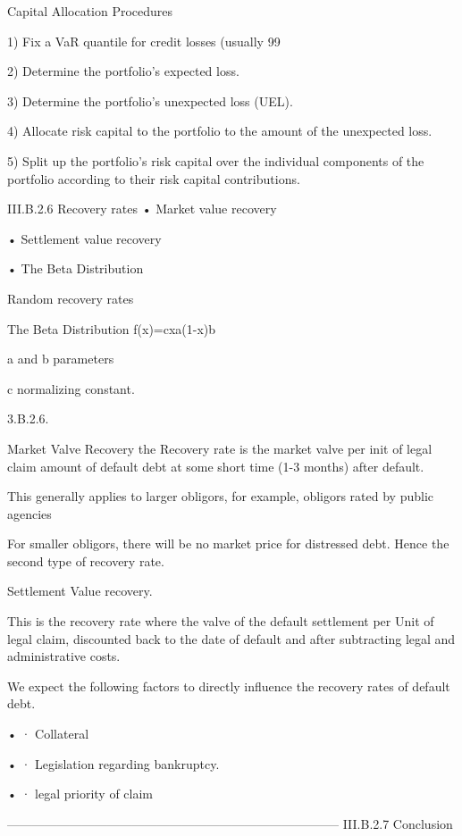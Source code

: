 Capital Allocation Procedures

1) Fix a VaR quantile for credit losses (usually 99%

2) Determine the portfolio’s expected loss.

3) Determine the portfolio’s unexpected loss (UEL).

4) Allocate risk capital to the portfolio to the amount of the unexpected loss.

5) Split up the portfolio’s risk capital over the individual components of the portfolio according to their risk capital contributions.


III.B.2.6 Recovery rates
•
Market value recovery

•
Settlement value recovery

•
The Beta Distribution


Random recovery rates

 

The Beta Distribution    f(x)=cxa(1-x)b

 

a and b parameters

c normalizing constant.

 

 


3.B.2.6.

Market Valve Recovery the Recovery rate is the market valve per init of legal claim amount of default debt at some short time (1-3 months) after default.

This generally applies to larger obligors, for example, obligors rated by public agencies

For smaller obligors, there will be no market price for distressed debt. Hence the second type of recovery rate.

Settlement Value recovery.

This is the recovery rate where the valve of the default settlement per Unit of legal claim, discounted back to the date of default and after subtracting legal and administrative costs.

 

We expect the following factors to directly influence the recovery rates of default debt.

•
·         Collateral

•
·         Legislation regarding bankruptcy.

•
·         legal priority of claim



 


--------------------------------------------------------------------------------
III.B.2.7 Conclusion

